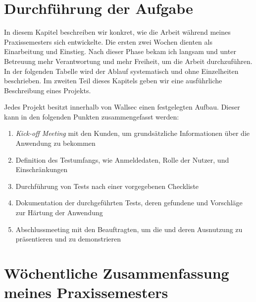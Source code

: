 \section{Durchführung der Aufgabe}

In diesem Kapitel beschreiben wir konkret, wie die Arbeit während meines Praxissemesters sich entwickelte. Die ersten zwei Wochen dienten als Einarbeitung und Einstieg. Nach dieser Phase bekam ich langsam und unter Betreuung mehr Verantwortung und mehr Freiheit, um die Arbeit durchzuführen. In der folgenden Tabelle wird der Ablauf systematisch und ohne Einzelheiten beschrieben. Im zweiten Teil dieses Kapitels geben wir eine ausführliche Beschreibung eines Projekts.

Jedes Projekt besitzt innerhalb von Wallsec einen festgelegten Aufbau. Dieser kann in den folgenden Punkten zusammengefasst werden:

\begin{enumerate} \label{Projektablauf}
    \item \textit{Kick-off Meeting} mit den Kunden, um grundsätzliche Informationen über die Anwendung zu bekommen
    \item Definition des Testumfangs, wie Anmeldedaten, Rolle der Nutzer,  und Einschränkungen
    \item Durchführung von Tests nach einer vorgegebenen Checkliste
    \item Dokumentation der durchgeführten Tests, deren gefundene  und Vorschläge zur Härtung der Anwendung
    \item Abschlussmeeting mit den Beauftragten, um die  und deren Ausnutzung zu präsentieren und zu demonstrieren
\end{enumerate} 

\section{Wöchentliche Zusammenfassung meines Praxissemesters}

